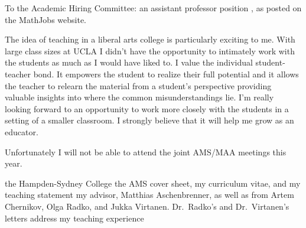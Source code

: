 \documentclass[11pt]{letter}
\begin{document}



\def\teachliberalart{{The idea of teaching in a liberal arts college is particularly exciting to me.
With large class sizes at UCLA I didn't have the opportunity to intimately work with the students as much as I would have liked to.
I value the individual student-teacher bond.
It empowers the student to realize their full potential and it allows the teacher to relearn the material from a student's perspective providing valuable insights into where the common misunderstandings lie.
I'm really looking forward to an opportunity to work more closely with the students in a setting of a smaller classroom.
I strongly believe that it will help me grow as an educator.
}}
\def\joint{{

Unfortunately I will not be able to attend the joint AMS/MAA meetings this year.}}

\def\recommendation{{my advisor, Matthias Aschenbrenner, as well as from Artem Chernikov, Olga Radko, and Jukka Virtanen. Dr.~Radko's and Dr.~Virtanen's letters address my teaching experience}}
\def\teachrecommendation{{Olga Radko and Jukka Virtanen addressing my teaching experience}}

\def\mathjobs{{, as posted on the MathJobs website.}}

\def\generic {{the AMS cover sheet, my curriculum vitae, my research and teaching statements}}
\def\noresearch {{the AMS cover sheet, my curriculum vitae, and my teaching statement}}
\def\publication {{the AMS cover sheet, curriculum vitae, publication list, my research and teaching statements}}

\def\genintro{{To the Academic Hiring Committee:}}
\def\lecture{{a lecturer position in mathematics}}

 
\coverletter
  {}
  {\genintro}
  {an assistant professor position}
  {\mathjobs}
  {\teachliberalart\joint}
  {the Hampden-Sydney College}
  {\noresearch}
  {\recommendation}
\end{document}
